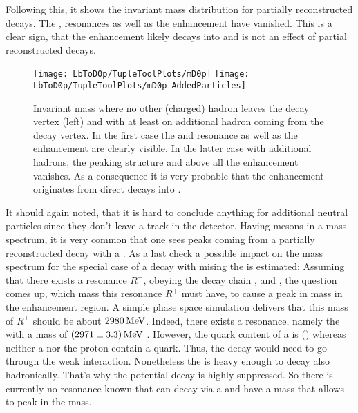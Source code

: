 Following this, it shows the invariant \Dz\proton mass distribution for partially reconstructed decays.
The \LcResI, \LcResII resonances as well as the enhancement have vanished.
This is a clear sign, that the enhancement likely decays into \Dz\proton and is not an effect of partial reconstructed decays.
\begin{figure}[hptb]
	\centering
	\texttt{[image: LbToD0p/TupleToolPlots/mD0p]}
	\texttt{[image: LbToD0p/TupleToolPlots/mD0p\_AddedParticles]}
	\caption{Invariant \Dz\proton mass where no other (charged) hadron leaves the \Dz\proton\mun decay vertex (left) and with at least on additional hadron coming from the \Dz\proton\mun decay vertex.
             In the first case the \LcResI and \LcResII resonance as well as the enhancement are clearly visible.
             In the latter case with additional hadrons, the peaking structure and above all the enhancement vanishes. 
             As a consequence it is very probable that the enhancement originates from direct decays into \Dz\proton.
    }
	\label{fig:plot_mD0p_AdditionalParticles}
\end{figure}

It should again noted, that it is hard to conclude anything for additional neutral particles since they don't leave a track in the detector.
Having \D mesons in a mass spectrum, it is very common that one sees peaks coming from a partially reconstructed decay with a \decay{\Dstar}{\D\pion}.
As a last check a possible impact on the \Dz\proton mass spectrum for the special case of a \decay{\Dstarz}{\Dz\piz} decay with mising the \piz is estimated:
Assuming that there exists a resonance $R^{+}$, obeying the decay chain ,  and \decay{\Dstarz}{\Dz\piz}, the question comes up, which mass this resonance $R^{+}$ must have, to cause a peak in \Dz\proton mass in the enhancement region.
A simple phase space simulation delivers that this mass of $R^{+}$ should be about $2980\mathrm{\,Me\kern -0.1em V}$.
Indeed, there exists a resonance, namely the  with a mass of $(2971 \pm 3.3)\mathrm{\,Me\kern -0.1em V}$ \cite{PDG}.
However, the quark content of a \Xicp is (\uquark\cquark\squark) whereas neither a \Dstarz nor the proton contain a \squark quark.
Thus, the decay  would need to go through the weak interaction.
Nonetheless the  is heavy enough to decay also hadronically. 
That's why the potential decay  is highly suppressed.
So there is currently no resonance known that can decay via a \Dstarz\proton and have a mass that allows to peak in the \Dz\proton mass.

